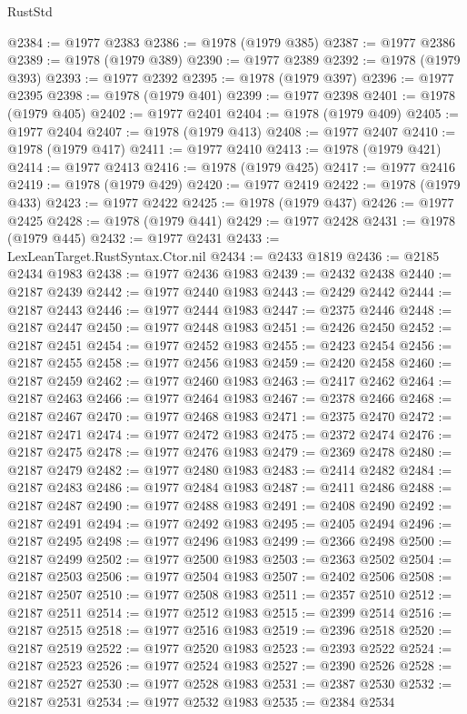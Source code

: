 \begin{lexlean}{RustStd}
\begin{coremodule}
@2384 := @1977 @2383
@2386 := @1978 (@1979 @385)
@2387 := @1977 @2386
@2389 := @1978 (@1979 @389)
@2390 := @1977 @2389
@2392 := @1978 (@1979 @393)
@2393 := @1977 @2392
@2395 := @1978 (@1979 @397)
@2396 := @1977 @2395
@2398 := @1978 (@1979 @401)
@2399 := @1977 @2398
@2401 := @1978 (@1979 @405)
@2402 := @1977 @2401
@2404 := @1978 (@1979 @409)
@2405 := @1977 @2404
@2407 := @1978 (@1979 @413)
@2408 := @1977 @2407
@2410 := @1978 (@1979 @417)
@2411 := @1977 @2410
@2413 := @1978 (@1979 @421)
@2414 := @1977 @2413
@2416 := @1978 (@1979 @425)
@2417 := @1977 @2416
@2419 := @1978 (@1979 @429)
@2420 := @1977 @2419
@2422 := @1978 (@1979 @433)
@2423 := @1977 @2422
@2425 := @1978 (@1979 @437)
@2426 := @1977 @2425
@2428 := @1978 (@1979 @441)
@2429 := @1977 @2428
@2431 := @1978 (@1979 @445)
@2432 := @1977 @2431
@2433 := LexLeanTarget.RustSyntax.Ctor.nil
@2434 := @2433 @1819
@2436 := @2185 @2434 @1983
@2438 := @1977 @2436 @1983
@2439 := @2432 @2438
@2440 := @2187 @2439
@2442 := @1977 @2440 @1983
@2443 := @2429 @2442
@2444 := @2187 @2443
@2446 := @1977 @2444 @1983
@2447 := @2375 @2446
@2448 := @2187 @2447
@2450 := @1977 @2448 @1983
@2451 := @2426 @2450
@2452 := @2187 @2451
@2454 := @1977 @2452 @1983
@2455 := @2423 @2454
@2456 := @2187 @2455
@2458 := @1977 @2456 @1983
@2459 := @2420 @2458
@2460 := @2187 @2459
@2462 := @1977 @2460 @1983
@2463 := @2417 @2462
@2464 := @2187 @2463
@2466 := @1977 @2464 @1983
@2467 := @2378 @2466
@2468 := @2187 @2467
@2470 := @1977 @2468 @1983
@2471 := @2375 @2470
@2472 := @2187 @2471
@2474 := @1977 @2472 @1983
@2475 := @2372 @2474
@2476 := @2187 @2475
@2478 := @1977 @2476 @1983
@2479 := @2369 @2478
@2480 := @2187 @2479
@2482 := @1977 @2480 @1983
@2483 := @2414 @2482
@2484 := @2187 @2483
@2486 := @1977 @2484 @1983
@2487 := @2411 @2486
@2488 := @2187 @2487
@2490 := @1977 @2488 @1983
@2491 := @2408 @2490
@2492 := @2187 @2491
@2494 := @1977 @2492 @1983
@2495 := @2405 @2494
@2496 := @2187 @2495
@2498 := @1977 @2496 @1983
@2499 := @2366 @2498
@2500 := @2187 @2499
@2502 := @1977 @2500 @1983
@2503 := @2363 @2502
@2504 := @2187 @2503
@2506 := @1977 @2504 @1983
@2507 := @2402 @2506
@2508 := @2187 @2507
@2510 := @1977 @2508 @1983
@2511 := @2357 @2510
@2512 := @2187 @2511
@2514 := @1977 @2512 @1983
@2515 := @2399 @2514
@2516 := @2187 @2515
@2518 := @1977 @2516 @1983
@2519 := @2396 @2518
@2520 := @2187 @2519
@2522 := @1977 @2520 @1983
@2523 := @2393 @2522
@2524 := @2187 @2523
@2526 := @1977 @2524 @1983
@2527 := @2390 @2526
@2528 := @2187 @2527
@2530 := @1977 @2528 @1983
@2531 := @2387 @2530
@2532 := @2187 @2531
@2534 := @1977 @2532 @1983
@2535 := @2384 @2534

\end{coremodule}
\end{lexlean}

